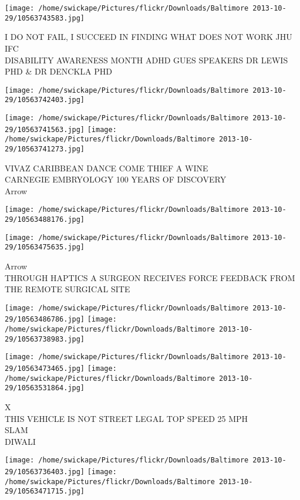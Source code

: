 \documentclass[10pt,letterpaper]{article}
\begin{document}
\vspace{0.25in}
\texttt{[image: /home/swickape/Pictures/flickr/Downloads/Baltimore 2013-10-29/10563743583.jpg]}

I DO NOT FAIL, I SUCCEED IN FINDING WHAT DOES NOT WORK JHU IFC\\
DISABILITY AWARENESS MONTH ADHD GUES SPEAKERS DR LEWIS PHD \& DR DENCKLA PHD
\pagebreak

\texttt{[image: /home/swickape/Pictures/flickr/Downloads/Baltimore 2013-10-29/10563742403.jpg]}

\vspace{0.25in}
\texttt{[image: /home/swickape/Pictures/flickr/Downloads/Baltimore 2013-10-29/10563741563.jpg]}
\texttt{[image: /home/swickape/Pictures/flickr/Downloads/Baltimore 2013-10-29/10563741273.jpg]}

VIVAZ CARIBBEAN DANCE COME THIEF A WINE\\
CARNEGIE EMBRYOLOGY 100 YEARS OF DISCOVERY\\
Arrow
\pagebreak

\texttt{[image: /home/swickape/Pictures/flickr/Downloads/Baltimore 2013-10-29/10563488176.jpg]}

\vspace{0.25in}
\texttt{[image: /home/swickape/Pictures/flickr/Downloads/Baltimore 2013-10-29/10563475635.jpg]}

Arrow\\
THROUGH HAPTICS A SURGEON RECEIVES FORCE FEEDBACK FROM THE REMOTE SURGICAL SITE
\pagebreak

\texttt{[image: /home/swickape/Pictures/flickr/Downloads/Baltimore 2013-10-29/10563486786.jpg]}
\texttt{[image: /home/swickape/Pictures/flickr/Downloads/Baltimore 2013-10-29/10563738983.jpg]}

\texttt{[image: /home/swickape/Pictures/flickr/Downloads/Baltimore 2013-10-29/10563473465.jpg]}
\texttt{[image: /home/swickape/Pictures/flickr/Downloads/Baltimore 2013-10-29/10563531864.jpg]}

X\\
THIS VEHICLE IS NOT STREET LEGAL TOP SPEED 25 MPH\\
SLAM\\
DIWALI
\pagebreak

\texttt{[image: /home/swickape/Pictures/flickr/Downloads/Baltimore 2013-10-29/10563736403.jpg]}
\texttt{[image: /home/swickape/Pictures/flickr/Downloads/Baltimore 2013-10-29/10563471715.jpg]}
\end{document}
